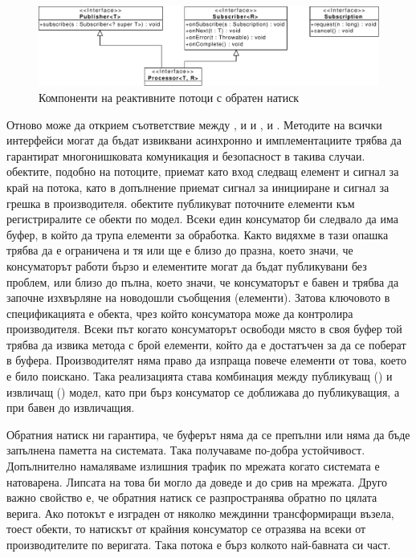 \begin{figure}
  \centering\includegraphics[width=\textwidth]{images/reactive-streams.pdf}
  \caption{Компоненти на реактивните потоци с обратен натиск}
  \label{fig:reactive-streams}
\end{figure}

Отново може да открием съответствие между ,  и  и ,  и . Методите на всички интерфейси могат да бъдат извиквани асинхронно и имплементациите трябва да гарантират многонишковата комуникация и безопасност в такива случаи.  обектите, подобно на  потоците, приемат като вход следващ елемент и сигнал за край на потока, като в допълнение приемат сигнал за иницииране и сигнал за грешка в производителя.  обектите публикуват поточните елементи към регистриралите се  обекти по  модел. Всеки един консуматор би следвало да има буфер, в който да трупа елементи за обработка. Както видяхме в  тази опашка трябва да е ограничена и тя или ще е близо до празна, което значи, че консуматорът работи бързо и елементите могат да бъдат публикувани без проблем, или близо до пълна, което значи, че консуматорът е бавен и трябва да започне изхвърляне на новодошли съобщения (елементи). Затова ключовото в спецификацията е  обекта, чрез който консуматора може да контролира производителя. Всеки път когато консуматорът освободи място в своя буфер той трябва да извика  метода с брой елементи, който да е достатъчен за да се поберат в буфера. Производителят няма право да изпраща повече елементи от това, което е било поискано. Така реализацията става комбинация между публикуващ () и извличащ () модел, като при бърз консуматор се доближава до публикуващия, а при бавен до извличащия.

Обратния натиск ни гарантира, че буферът няма да се препълни или няма да бъде запълнена паметта на системата. Така получаваме по-добра устойчивост. Допълнително намаляваме излишния трафик по мрежата когато системата е натоварена. Липсата на това би могло да доведе и до срив на мрежата. Друго важно свойство е, че обратния натиск се разпространява обратно по цялата верига. Ако потокът е изграден от няколко междинни трансформиращи възела, тоест  обекти, то натискът от крайния консуматор се отразява на всеки от производителите по веригата. Така потока е бърз колкото най-бавната си част.

